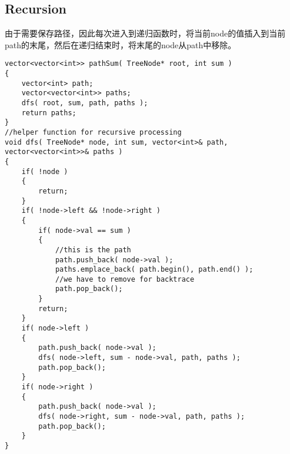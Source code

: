 \subsection{Recursion}
由于需要保存路径，因此每次进入到递归函数时，将当前node的值插入到当前path的末尾，然后在递归结束时，将末尾的node从path中移除。

\setcounter{lstlisting}{0}
\begin{lstlisting}[style=customc, caption={Backtrace}]
vector<vector<int>> pathSum( TreeNode* root, int sum )
{
    vector<int> path;
    vector<vector<int>> paths;
    dfs( root, sum, path, paths );
    return paths;
}
//helper function for recursive processing
void dfs( TreeNode* node, int sum, vector<int>& path, vector<vector<int>>& paths )
{
    if( !node )
    {
        return;
    }
    if( !node->left && !node->right )
    {
        if( node->val == sum )
        {
            //this is the path
            path.push_back( node->val );
            paths.emplace_back( path.begin(), path.end() );
            //we have to remove for backtrace
            path.pop_back();
        }
        return;
    }
    if( node->left )
    {
        path.push_back( node->val );
        dfs( node->left, sum - node->val, path, paths );
        path.pop_back();
    }
    if( node->right )
    {
        path.push_back( node->val );
        dfs( node->right, sum - node->val, path, paths );
        path.pop_back();
    }
}
\end{lstlisting}